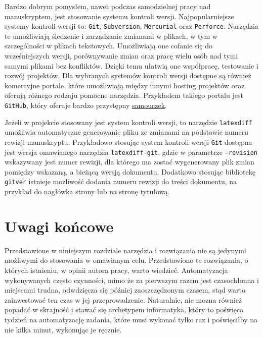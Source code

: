 Bardzo dobrym pomysłem, nawet podczas samodzielnej pracy nad manuskryptem, jest stosowanie systemu kontroli wersji. Najpopularniejsze systemy kontroli wersji to: \texttt{Git}, \texttt{Subversion}, \texttt{Mercurial} oraz \texttt{Perforce}. Narzędzia te umożliwiają śledzenie i zarządzanie zmianami w plikach, w tym w szczególności w plikach tekstowych. Umożliwiają one cofanie się do wcześniejszych wersji, porównywanie zmian oraz pracę wielu osób nad tymi samymi plikami bez konfliktów. Dzięki temu ułatwią one współpracę, testowanie i rozwój projektów. Dla wybranych systemów kontroli wersji dostępne są również komercyjne portale, które umożliwiają między innymi hosting projektów oraz oferują różnego rodzaju pomocne narzędzia. Przykładem takiego portalu jest \texttt{GitHub}, który oferuje bardzo przystępny \href{https://docs.github.com/en/get-started}{samouczek}.

Jeżeli w projekcie stosowany jest system kontroli wersji, to narzędzie \texttt{latexdiff} umożliwia automatyczne generowanie pliku ze zmianami na podstawie numeru rewizji manuskryptu. Przykładowo stosując system kontroli wersji \texttt{Git} dostępna jest wersja omawianego narzędzia \texttt{latexdiff-git}, gdzie w parametrze \texttt{--revision} wskazywany jest numer rewizji, dla którego ma zostać wygenerowany plik zmian pomiędzy wskazaną, a bieżącą wersją dokumentu. Dodatkowo stosując bibliotekę \texttt{gitver} istnieje możliwość dodania numeru rewizji do treści dokumentu, na przykład do nagłówka strony lub na stronę tytułową.

\section{Uwagi końcowe}

Przedstawione w niniejszym rozdziale narzędzia i rozwiązania nie są jedynymi możliwymi do stosowania w omawianym celu. Przedstawiono te rozwiązania, o których istnieniu, w opinii autora pracy, warto wiedzieć. Automatyzacja wykonywanych często czynności, mimo że za pierwszym razem jest czasochłonna i miejscami trudna, odwdzięcza się później zaoszczędzonym czasem, stąd warto zainwestować ten czas w jej przeprowadzenie. Naturalnie, nie mozna również popadać w skrajność i stawać się archetypem informatyka, który to poświęca tydzień na automatyzację zadania, które musi wykonać tylko raz i poświęciłby na nie kilka minut, wykonując je ręcznie.
